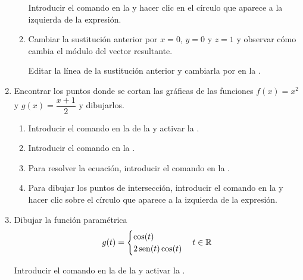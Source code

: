 \begin{enumerate}
\begin{enumerate}
            \begin{indication}
            Introducir el comando \command{|\$|} en la  y hacer clic en el círculo que aparece a la izquierda de la expresión.
            \end{indication}
      \item Cambiar la sustitución anterior por $x=0$, $y=0$ y $z=1$ y observar cómo cambia el módulo del vector resultante.
            \begin{indication}
            Editar la línea de la sustitución anterior y cambiarla por   en la .
            \end{indication}
      \end{enumerate}

\item Encontrar los puntos donde se cortan las gráficas de las funciones $f(x)=x^2$ y $g(x)=\dfrac{x+1}{2}$ y dibujarlos.
      \begin{enumerate}
      \item Introducir el comando  en la  de la  y activar la .
      \item Introducir el comando  en la .
      \item Para resolver la ecuación, introducir el comando  en la .
      \item Para dibujar los puntos de intersección, introducir el comando  en la  y hacer clic sobre el círculo que aparece a la izquierda de la expresión.
      \end{enumerate}

\item Dibujar la función paramétrica
      \[
      g(t)=
      \begin{cases}
      \cos(t) \\
      2\operatorname{sen}(t)\cos(t)
      \end{cases}
      t\in \mathbb{R}
      \]

      \begin{indication}
      Introducir el comando  en la  de la  y activar la .
      \end{indication}


\end{enumerate}
